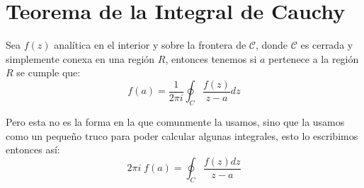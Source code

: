 \documentclass[12pt, fleqn]{report}                             %
\theoremstyle{break}                                            %
\begin{document}
        \section{Teorema de la Integral de Cauchy}

            Sea $f(z)$ analítica en el interior y sobre la frontera de $\mathcal{C}$, donde
            $\mathcal{C}$ es cerrada y simplemente conexa en una región $R$, entonces
            tenemos si $a$ pertenece a la región $R$ se cumple que:
            \begin{equation*}
                f(a) = \dfrac{1}{2 \pi i} \oint_C \dfrac{f(z)}{z-a} dz
            \end{equation*}

            Pero esta no es la forma en la que comunmente la usamos, sino que la usamos
            como un pequeño truco para poder calcular algunas integrales,
            esto lo escribimos entonces así:
            \begin{equation*}
                2 \pi i \; f(a) = \oint_C \dfrac{f(z) dz}{z-a}
            \end{equation*}






\end{document}
